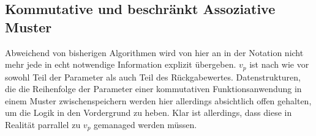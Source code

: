 \subsection{Kommutative und beschränkt Assoziative Muster} \label{subsecACMuster}


Abweichend von bisherigen Algorithmen wird von hier an in der Notation nicht mehr jede in echt notwendige Information explizit übergeben. $v_p$ ist nach wie vor sowohl Teil der Parameter als auch Teil des Rückgabewertes. Datenstrukturen, die die Reihenfolge der Parameter einer kommutativen Funktionsanwendung in einem Muster zwischenspeichern werden hier allerdings absichtlich offen gehalten, um die Logik in den Vordergrund zu heben. Klar ist allerdings, dass diese in Realität parrallel zu $v_p$ gemanaged werden müssen.
 
\begin{algorithm}
\DontPrintSemicolon
\caption{$\mathrm{FindCommutativeMatch} \colon M \times T \rightarrow \mathit{Bool}$}\label{FindCommutativeMatch}

 {
}
\end{algorithm}

\begin{algorithm}
\DontPrintSemicolon
\caption{$\mathrm{FindPermutation} \colon M \times T \times \mathbb N \times \mathbb N \rightarrow \mathit{Bool}$}\label{FindPermutation}
  {
 }
  {
    \;
 }
\end{algorithm}

